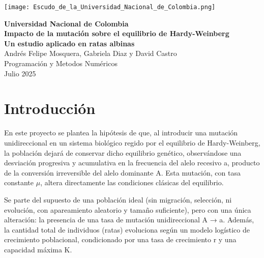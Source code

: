 \documentclass[12pt]{article}
\begin{document}
\begin{titlepage}
    \begin{center}
        \vspace*{1cm}
        
        \texttt{[image: Escudo\_de\_la\_Universidad\_Nacional\_de\_Colombia.png]}
        
        \vspace{0.5cm}
        
        {\Large\textbf{Universidad Nacional de Colombia}}\\[1.5cm]
        
        {\Huge\textbf{Impacto de la mutación sobre el equilibrio de Hardy-Weinberg}}\\
        {\large\textbf{Un estudio aplicado en ratas albinas}}\\[2cm]
    
        
        {\large Andrés Felipe Mosquera, Gabriela Diaz y David Castro}\\[2cm]
        
        {\large Programación y Metodos Numéricos}\\[1.5cm]
        
        {\large Julio 2025}
        
    \end{center}
\end{titlepage}

\tableofcontents
\newpage

\section{Introducción}

En este proyecto se plantea la hipótesis de que, al introducir una mutación unidireccional en un sistema biológico regido por el equilibrio de Hardy-Weinberg, la población dejará de conservar dicho equilibrio genético, observándose una desviación progresiva y acumulativa en la frecuencia del alelo recesivo a, producto de la conversión irreversible del alelo dominante A. Esta mutación, con tasa constante \(\mu\), altera directamente las condiciones clásicas del equilibrio.

Se parte del supuesto de una población ideal (sin migración, selección, ni evolución, con apareamiento aleatorio y tamaño suficiente), pero con una única alteración: la presencia de una tasa de mutación unidireccional A → a. Además, la cantidad total de individuos (ratas) evoluciona según un modelo logístico de crecimiento poblacional, condicionado por una tasa de crecimiento r y una capacidad máxima K.
\end{document}
